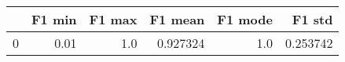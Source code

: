 \begin{tabular}{lrrrrr}
\toprule
{} &  F1 min &  F1 max &   F1 mean &  F1 mode &    F1 std \\
\midrule
0 &    0.01 &     1.0 &  0.927324 &      1.0 &  0.253742 \\
\bottomrule
\end{tabular}
